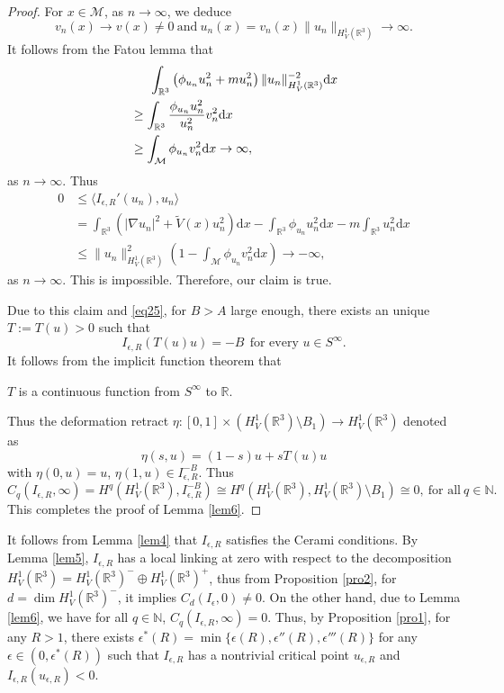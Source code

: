 \documentclass[12pt]{amsart}
\numberwithin{equation}{section}
\theoremstyle{definition}
\begin{document}
\begin{proof}
For $x\in\mathcal{M}$, as $n\to\infty$, we deduce
$$v_n(x)\to v(x)\neq 0~\text{and}~u_{n}(x)=v_{n}(x)\|u_n\|_{H^1_{V}(\mathbb{R}^3)}\to\infty.$$
It follows from the Fatou lemma that
\begin{equation*}
	\begin{split}
&\indent\int_{\mathbb{R}^3}\left(\phi_{u_n}u^{2}_{n}+mu_{n}^{2}\right)\|u_n\|^{-2}_{H^{1}_{V}(\mathbb{R}^3)}\text{d}x\\
&\geq\int_{\mathbb{R}^3}\frac{\phi_{u_n}u^{2}_{n}}{u_{n}^{2}}v^{2}_{n}\text{d}x\\
&\geq \int_{\mathcal{M}}\phi_{u_n}v^{2}_n\text{d}x\to\infty,
\end{split}
\end{equation*}
as $n\to\infty$. Thus
\begin{equation*}
		\begin{split}
		0&\leq \langle I_{\epsilon,R}'(u_n),u_n\rangle\\
		&=\int_{\mathbb{R}^3}\left(|\nabla u_n|^{2}+\tilde V(x)u_n^{2}\right)\text{d}x-\int_{\mathbb{R}^3}\phi_{u_n}u_n^{2}\text{d}x-m\int_{\mathbb{R}^3}u_n^{2}\text{d}x\\
		&\leq\|u_n\|_{H^{1}_{V}(\mathbb{R}^3)}^{2}\left(1-\int_{\mathcal{M}}\phi_{u_n}v^{2}_n\text{d}x\right)\to-\infty,
	\end{split}\end{equation*}
as  $n\to\infty$. This is impossible. Therefore, our claim is true.

Due to this claim and \eqref{eq25}, for $B>A$ large enough, there exists an unique $T:=T(u)>0$ such that
$$I_{\epsilon,R}(T(u)u)=-B\ \ \text{for every }u\in S^{\infty}.$$
It follows from the implicit function theorem that
\begin{center}
$T$ is a continuous function from $S^{\infty}$ to $\mathbb{R}$.
\end{center}
Thus the deformation retract $\eta:[0,1]\times(H^{1}_{V}(\mathbb{R}^3)\setminus B_{1})\to H^{1}_{V}(\mathbb{R}^3)$ denoted as
$$\eta(s,u)=(1-s)u+sT(u)u$$
with $\eta(0,u)=u$, $\eta(1,u)\in I_{\epsilon,R}^{-B}$. Thus
$$C_{q}(I_{\epsilon,R},\infty)=H^{q}(H^{1}_{V}(\mathbb{R}^3),I_{\epsilon,R}^{-B})\cong H^{q}(H^{1}_{V}(\mathbb{R}^3),H^{1}_{V}(\mathbb{R}^3)\setminus B_{1})\cong0,\ \mbox{for all}\ q\in \mathbb{N}.$$
This completes the proof of  Lemma \ref{lem6}.
\end{proof}
 It follows from Lemma \ref{lem4} that $I_{\epsilon,R}$ satisfies the Cerami conditions. By Lemma \ref{lem5}, $I_{\epsilon,R}$ has a local linking at zero with respect to the decomposition $H^{1}_{V}(\mathbb{R}^3)=H^{1}_{V}(\mathbb{R}^3)^{-}\oplus H^{1}_{V}(\mathbb{R}^3)^{+}$, thus from Proposition \ref{pro2}, for $d=\dim H^{1}_{V}(\mathbb{R}^3)^{-}$, it implies $C_{d}(I_{\epsilon},0)\neq0.$ On the other hand, due to Lemma \ref{lem6}, we have for all $q\in\mathbb{N}$, $C_{q}(
I_{\epsilon,R},\infty)=0$. Thus, by Proposition \ref{pro1}, for any $R>1$, there exists $\epsilon^{\ast}(R)=\min\{\epsilon(R),\epsilon''(R),\epsilon'''(R)\}$ for any $\epsilon\in(0,\epsilon^{\ast}(R))$ such that  $I_{\epsilon,R}$ has a nontrivial critical point $u_{\epsilon,R}$ and $I_{\epsilon,R}(u_{\epsilon,R})<0$.
\end{document}
